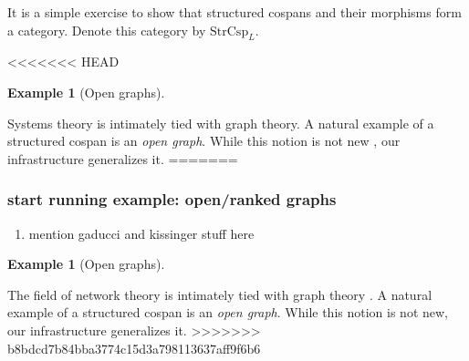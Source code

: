 \documentclass{amsart}
\newcommand{\StrCsp}{\cat{StrCsp}}
\newcommand{\cat}[1]{\mathrm{#1}}
\theoremstyle{remark}
\theoremstyle{definition}
\newtheorem{example}[theorem]{Example}
\begin{document}
It is a simple exercise to show that structured cospans and their
morphisms form a category.  Denote this category by $ \StrCsp_L
$. 

<<<<<<< HEAD
\begin{example}[Open graphs] \label{ex:open-graphs}

  Systems theory is intimately tied with graph theory.  A natural
  example of a structured cospan is an \emph{open graph}. While this
  notion is not new \cite{DixKiss_OpenGraphs,Gadd_IndGraphTrans}, our
  infrastructure generalizes it.
=======
\subsubsection{start running example: open/ranked graphs}
\label{sec-2-2-3}

\begin{enumerate}
\item mention gaducci and kissinger stuff here
\label{sec-2-2-3-1}
\end{enumerate}

\begin{example}[Open graphs] \label{ex:open-graphs}

  The field of network theory is intimately tied with graph theory
  \cite{networks}. A natural example of a structured cospan is an
  \emph{open graph}. While this notion is not new,
  our infrastructure generalizes it.
>>>>>>> b8bdcd7b84bba3774c15d3a798113637aff9f6b6


\end{example}
\end{example}
\end{document}
